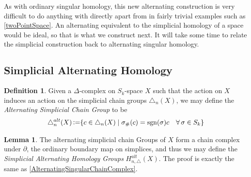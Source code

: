 \documentclass[11pt,a4paper,twoside]{article}
\theoremstyle{plain}
\theoremstyle{definition}
\newtheorem{defn}[thm]{Definition}
\theoremstyle{definition}
\newtheorem{lemma}[thm]{Lemma}
\theoremstyle{definition}
\theoremstyle{definition}
\theoremstyle{definition}
\DeclareMathOperator{\sgn}{sgn}
\DeclareMathOperator{\coloneqq}{\vcentcolon=}
\begin{document}
\vspace{2mm}

As with ordinary singular homology, this new alternating construction is very difficult to do anything with directly apart from in fairly trivial examples such as \ref{twoPointSpace}. An alternating equivalent to the simplicial homology of a space would be ideal, so that is what we construct next. It will take some time to relate the simplicial construction back to alternating singular homology.




\subsection{Simplicial Alternating Homology}
\label{Sec_AlternatingSimplicialHomology}

\begin{defn}
Given a $\Delta$-complex on $S_k$-space $X$ such that the action on $X$ induces an action on the simplicial chain groups $\triangle_n(X)$, we may define the \emph{Alternating Simplicial Chain Group} to be
$$\triangle_{n}^{alt}(X) \coloneqq \{ c \in \triangle_n(X) \mid \sigma_\#(c) = \sgn(\sigma)c \quad \forall \,\sigma \in S_k\}$$
\end{defn}

\begin{lemma}
The alternating simplicial chain Groups of $X$ form a chain complex under $\partial$, the ordinary boundary map on simplices, and thus we may define the \emph{Simplicial Alternating Homology Groups} 
$H_{n,\triangle}^{alt}(X)$. The proof is exactly the same as \ref{AlternatingSingularChainComplex}.
\end{lemma}
\end{document}
